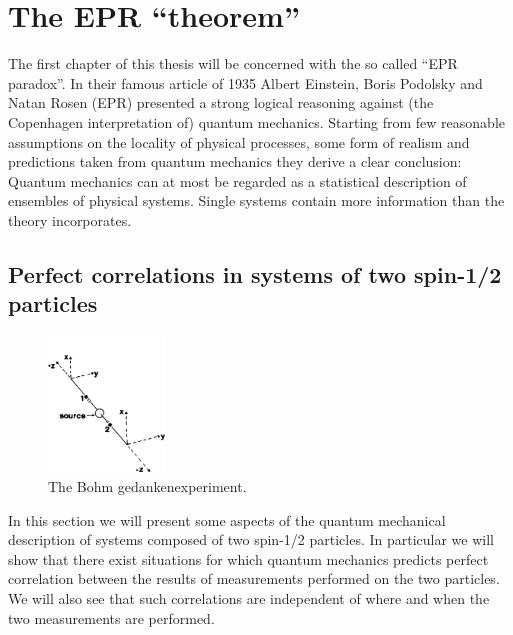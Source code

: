 \chapter{The EPR ``theorem''}
\label{chap:epr}
The first chapter of this thesis will be concerned with the so called ``EPR paradox''. In their famous article of 1935 \cite{PhysRev.47.777} Albert Einstein, Boris Podolsky and Natan Rosen (EPR) presented a strong logical reasoning against (the Copenhagen interpretation of) quantum mechanics. Starting from few reasonable assumptions on the locality of physical processes, some form of realism and predictions taken from quantum mechanics they derive a clear conclusion: Quantum mechanics can at most be regarded as a statistical description of ensembles of physical systems. Single systems contain more information than the theory incorporates.%


\section{Perfect correlations in systems of two spin-1/2 particles}
\label{sec:two-spin1/2}

\begin{figure}
  \centering
  \includegraphics[width=0.275\textwidth]{Mainmatter/Chapter1/eprb-gedankenexperiment.png}
  \caption{The Bohm gedankenexperiment.}
  \label{fig:eprb-gedankenexperiment}
\end{figure}

In this section we will present some aspects of the quantum mechanical description of systems composed of two spin-1/2 particles. In particular we will show that there exist situations for which quantum mechanics predicts perfect correlation between the results of measurements performed on the two particles. We will also see that such correlations are independent of where and when the two measurements are performed.%

